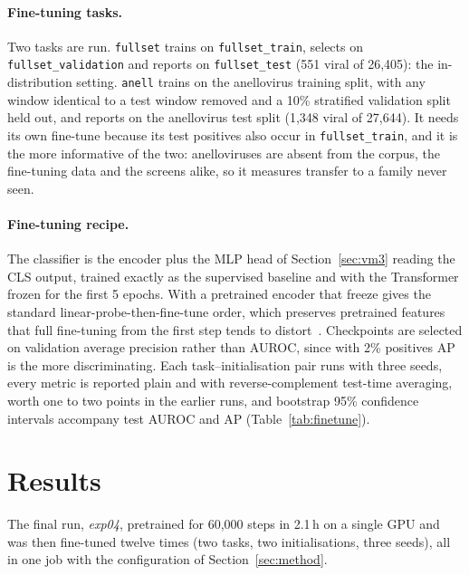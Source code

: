 \documentclass[10pt,twocolumn,a4paper]{article}
\begin{document}
\paragraph{Fine-tuning tasks.}
Two tasks are run. \texttt{fullset} trains on \texttt{fullset\_train}, selects on
\texttt{fullset\_validation} and reports on \texttt{fullset\_test} (551 viral of
26{,}405): the in-distribution setting. \texttt{anell} trains on the anellovirus
training split, with any window identical to a test window removed and a 10\%
stratified validation split held out, and reports on the anellovirus test split
(1{,}348 viral of 27{,}644). It needs its own fine-tune because its test
positives also occur in \texttt{fullset\_train}, and it is the more informative
of the two: anelloviruses are absent from the corpus, the fine-tuning data and
the screens alike, so it measures transfer to a family never seen.

\paragraph{Fine-tuning recipe.}
The classifier is the encoder plus the MLP head of Section~\ref{sec:vm3} reading
the CLS output, trained exactly as the supervised baseline and with the
Transformer frozen for the first 5 epochs. With a pretrained encoder that freeze
gives the standard linear-probe-then-fine-tune order, which preserves pretrained
features that full fine-tuning from the first step tends to
distort~\cite{kumar2022lpft}. Checkpoints are selected on validation average
precision rather than AUROC, since with 2\% positives AP is the more
discriminating. Each task--initialisation pair runs with three seeds, every
metric is reported plain and with reverse-complement test-time averaging, worth
one to two points in the earlier runs, and bootstrap 95\% confidence intervals
accompany test AUROC and AP (Table~\ref{tab:finetune}).

\section{Results}\label{sec:results}

The final run, \emph{exp04}, pretrained for 60{,}000 steps in 2.1\,h on a single
GPU and was then fine-tuned twelve times (two tasks, two initialisations,
three seeds), all in one job with the configuration of Section~\ref{sec:method}.
\end{document}

